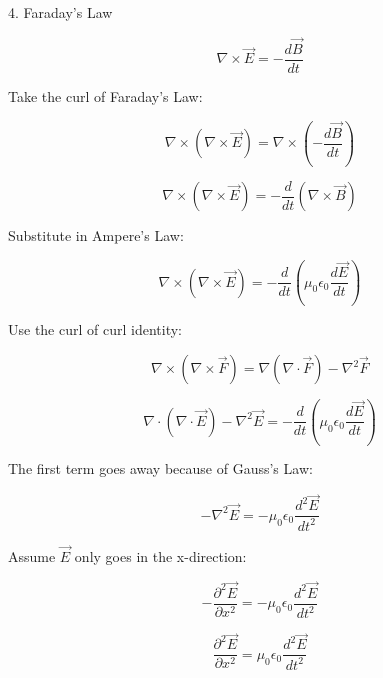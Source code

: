 4. Faraday's Law

\[
\nabla \times \vec{E} = -\frac{d \vec{B}}{dt}
\]

\vspace{1em}

Take the curl of Faraday's Law:

\vspace{1em}

\[
\nabla \times (\nabla \times \vec{E}) = \nabla \times \left(-\frac{d \vec{B}}{dt}\right)
\]

\[
\nabla \times (\nabla \times \vec{E}) = -\frac{d}{dt} (\nabla \times \vec{B})
\]

\vspace{1em}

Substitute in Ampere's Law:

\vspace{1em}

\[
\nabla \times (\nabla \times \vec{E}) = -\frac{d}{dt} \left(\mu_0 \epsilon_0 \frac{d \vec{E}}{dt}\right)
\]

\vspace{1em}

Use the curl of curl identity:

\[
\nabla \times (\nabla \times \vec{F}) = \nabla (\nabla \cdot \vec{F}) - \nabla^2 \vec{F}
\]

\[
\nabla \cdot (\nabla \cdot \vec{E}) - \nabla^2 \vec{E} = -\frac{d}{dt} \left(\mu_0 \epsilon_0 \frac{d \vec{E}}{dt}\right)
\]

The first term goes away because of Gauss's Law:

\[
- \nabla^2 \vec{E} = -\mu_0 \epsilon_0 \frac{d^2 \vec{E}}{dt^2}
\]

Assume \(\vec{E}\) only goes in the x-direction:

\[
- \frac{\partial^2 \vec{E}}{\partial x^2} = -\mu_0 \epsilon_0 \frac{d^2 \vec{E}}{dt^2}
\]

\vspace{1em}

\[
\frac{\partial^2 \vec{E}}{\partial x^2} = \mu_0 \epsilon_0 \frac{d^2 \vec{E}}{dt^2}
\]



% 
